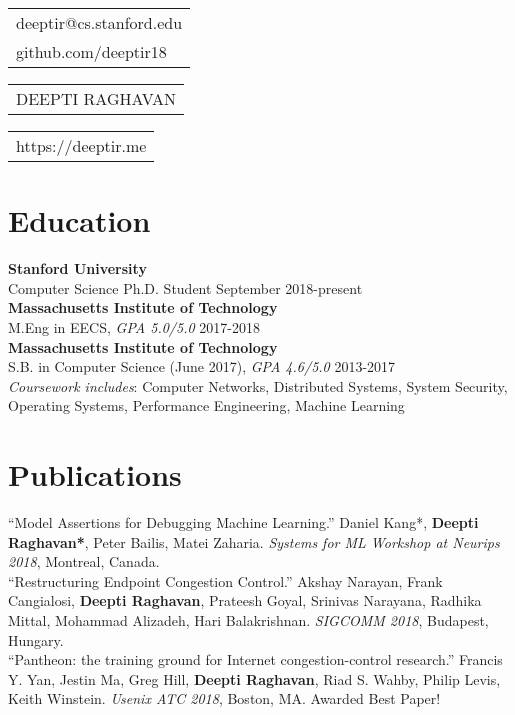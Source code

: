\documentclass[11pt]{report}
\begin{document}
%
\noindent
{\small\begin{tabular}[c]{l}
	deeptir@cs.stanford.edu \\
	github.com/deeptir18
\end{tabular}}\hfill%
{\Large\bfseries\begin{tabular}[c]{c}
		DEEPTI RAGHAVAN
\end{tabular}}\hfill%
{\small\begin{tabular}[c]{r}
https://deeptir.me
\end{tabular}}

\bigskip

\section{Education}
\noindent
\textbf{Stanford University} \\
Computer Science Ph.D. Student \hfill September 2018-present\\

\noindent
\textbf{Massachusetts Institute of Technology} \\
M.Eng in EECS, \textit{GPA 5.0/5.0} \hfill 2017-2018\\

\noindent\textbf{Massachusetts Institute of Technology} \\
\noindent S.B. in Computer Science (June 2017),  \textit{GPA 4.6/5.0} \hfill 2013-2017\\
\noindent \textit{Coursework includes}: Computer Networks, Distributed Systems, System Security, Operating Systems, Performance Engineering, Machine Learning

\section{Publications}
\noindent``Model Assertions for Debugging Machine Learning.'' Daniel Kang*,
\textbf{Deepti Raghavan*}, Peter Bailis, Matei Zaharia. \textit{Systems for ML Workshop
at Neurips 2018}, Montreal, Canada.\\

\noindent``Restructuring Endpoint Congestion Control.'' Akshay Narayan, Frank Cangialosi, \textbf{Deepti Raghavan}, Prateesh Goyal, Srinivas Narayana, Radhika Mittal, Mohammad Alizadeh, Hari Balakrishnan. \emph{SIGCOMM 2018}, Budapest, Hungary.\\

\noindent ``Pantheon: the training ground for Internet congestion-control research.'' Francis Y. Yan, Jestin Ma, Greg Hill, \textbf{Deepti Raghavan}, Riad S. Wahby, Philip Levis, Keith Winstein. \emph{Usenix ATC 2018}, Boston, MA. Awarded Best Paper!\\
\end{document}
